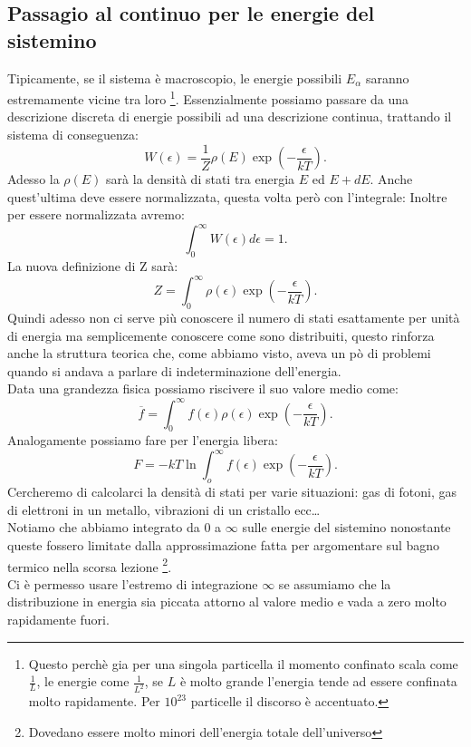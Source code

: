 \subsection{Passagio al continuo per le energie del sistemino}%
Tipicamente, se il sistema è macroscopio, le energie possibili $E_{\alpha}$ saranno estremamente vicine tra loro \footnote{Questo perchè gia per una singola particella il momento confinato scala come $\frac{1}{L}$, le energie come $\frac{1}{L^2}$, se $L$ è molto grande l'energia tende ad essere confinata molto rapidamente. Per $10^{23}$ particelle il discorso è accentuato.}. Essenzialmente possiamo passare da una descrizione discreta di energie possibili ad una descrizione continua, trattando il sistema di conseguenza:
\[
	W\left( \epsilon \right) = \frac{1}{Z} \rho\left( E \right) \exp \left(- \frac{\epsilon}{kT} \right) 
.\] 
Adesso la $\rho\left( E \right) $ sarà la densità di stati tra energia $E$ ed $E+dE$. Anche quest'ultima deve essere normalizzata, questa volta però con l'integrale:
Inoltre per essere normalizzata avremo:
\[
	\int_{0}^{\infty} W\left( \epsilon \right) d\epsilon = 1
.\] 
La nuova definizione di Z sarà:
\[
	Z = \int_{0}^{\infty}\rho\left( \epsilon \right) \exp\left( -\frac{\epsilon}{kT} \right) 
.\] \label{eq:DefZ}
Quindi adesso non ci serve più conoscere il numero di stati esattamente per unità di energia ma semplicemente conoscere come sono distribuiti, questo rinforza anche la struttura teorica che, come abbiamo visto, aveva un pò di problemi quando si andava a parlare di indeterminazione dell'energia.\\
Data una grandezza fisica possiamo riscivere il suo valore medio come:
\[
	\overline{f} = \int_{0}^{\infty} f\left( \epsilon \right) \rho\left( \epsilon \right) \exp\left( -\frac{\epsilon}{kT} \right) 
.\] 
Analogamente possiamo fare per l'energia libera:
\[
	F = -kT \ln \int_{o}^{\infty} f\left( \epsilon \right) \exp\left( - \frac{\epsilon}{kT} \right) 
.\] 
Cercheremo di calcolarci la densità di stati per varie situazioni: gas di fotoni, gas di elettroni in un metallo, vibrazioni di un cristallo ecc\ldots\\
Notiamo che abbiamo integrato da 0 a $\infty$ sulle energie del sistemino nonostante queste fossero limitate dalla approssimazione fatta per argomentare sul bagno termico nella scorsa lezione \footnote{Dovedano essere molto minori dell'energia totale dell'universo}.\\
Ci è permesso usare l'estremo di integrazione $\infty$ se assumiamo che la distribuzione in energia sia piccata attorno al valore medio e vada a zero molto rapidamente fuori.\\

